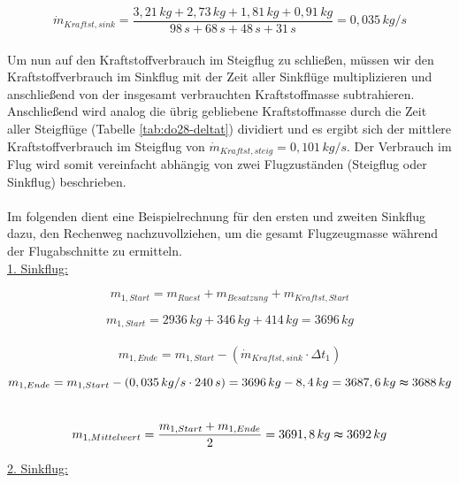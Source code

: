 \begin{equation}
	\dot{m}_{Kraftst,sink} = \frac{3,21\,kg + 2,73\,kg + 1,81\,kg + 0,91\,kg}{98\, s + 68 \,s + 48 \,s + 31 \,s} = 0,035 \, {kg/s}
\end{equation}
\\
Um nun auf den Kraftstoffverbrauch im Steigflug zu schließen, müssen wir den Kraftstoffverbrauch im Sinkflug mit der Zeit aller Sinkflüge multiplizieren und anschließend von der insgesamt verbrauchten Kraftstoffmasse subtrahieren. Anschließend wird analog die übrig gebliebene Kraftstoffmasse durch die Zeit aller Steigflüge (Tabelle \ref{tab:do28-deltat}) dividiert und es ergibt sich der mittlere Kraftstoffverbrauch im Steigflug von $\dot{m}_{Kraftst,steig} = 0,101 \, {kg/s}$. Der Verbrauch im Flug wird somit vereinfacht abhängig von zwei Flugzuständen (Steigflug oder Sinkflug) beschrieben.\\\\
Im folgenden dient eine Beispielrechnung für den ersten und zweiten Sinkflug dazu, den Rechenweg nachzuvollziehen, um die gesamt Flugzeugmasse während der Flugabschnitte zu ermitteln.
\\

\underline{1. Sinkflug:}

\begin{equation*}
m_{1,Start} = m_{Ruest} + m_{Besatzung} + m_{Kraftst,Start}
\end{equation*}

\begin{equation*}
m_{1,Start} = 2936 \, {kg} + 346 \, {kg} +414 \, {kg} = 3696 \, {kg}
\end{equation*}
\\

\begin{equation*}
m_{1,Ende} = m_{1,Start} - (\dot{m}_{Kraftst,sink} \cdot \Delta t_1)
\end{equation*}

\begin{equation*}
m_{1,Ende} = m_{1,Start} - (0,035 \, {kg/s} \cdot 240 \, {s}) = 3696 \, {kg} - 8,4 \, {kg} = 3687,6 \, {kg} \thickapprox 3688 \, {kg}
\end{equation*} \\

\begin{equation*}
m_{1,Mittelwert} = \frac{m_{1,Start} + m_{1,Ende}}{2} = 3691,8 \, {kg} \thickapprox 3692 \, {kg}
\end{equation*}

\vspace{5mm}
\underline{2. Sinkflug:}

